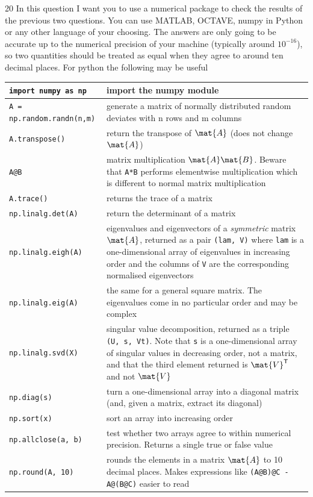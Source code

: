 \documentclass{sotonExamBoxes}    %
\begin{document}
\begin{question}{20}
    In this question I want you to use a numerical package to check
    the results of the previous two questions.  You can use MATLAB,
    OCTAVE, numpy in Python or any other language of your choosing.
    The answers are only going to be accurate up to the numerical
    precision of your machine (typically around $10^{-16}$), so two
    quantities should be treated as equal when they agree to around
    ten decimal places.  For python the following may be useful

    \begin{tabularx}{\linewidth}{@{}l|X@{}}
      \hline
      \verb+import numpy as np+ & import the numpy module\\ \hline
    \verb+A = np.random.randn(n,m)+ & generate a matrix of
      normally distributed random deviates with n rows and m columns\\ \hline
    \verb+A.transpose()+ & return the transpose of $\mat{A}$
      (does not change $\mat{A}$)\\ \hline
    \verb+A@B+ & matrix multiplication $\mat{A}\mat{B}$.  Beware
      that \verb+A*B+ performs elementwise multiplication which is
      different to normal matrix multiplication\\ \hline
    \verb+A.trace()+ & returns the trace of a matrix\\ \hline
    \verb+np.linalg.det(A)+ & return the determinant of a matrix\\ \hline
    \verb+np.linalg.eigh(A)+ & eigenvalues and eigenvectors of a
      \emph{symmetric} matrix $\mat{A}$, returned as a pair
      \verb+(lam, V)+ where \verb+lam+ is a one-dimensional array of
      eigenvalues in increasing order and the columns of \verb+V+
      are the corresponding normalised eigenvectors\\ \hline
    \verb+np.linalg.eig(A)+ & the same for a general square matrix.
      The eigenvalues come in no particular order and may be
      complex\\ \hline
    \verb+np.linalg.svd(X)+ & singular value decomposition, returned
      as a triple \verb+(U, s, Vt)+.  Note that \verb+s+ is a
      one-dimensional array of singular values in decreasing order,
      not a matrix, and that the third element returned is
      $\mat{V}^\tr$ and not $\mat{V}$\\ \hline
    \verb+np.diag(s)+ & turn a one-dimensional array into a diagonal
      matrix (and, given a matrix, extract its diagonal)\\ \hline
    \verb+np.sort(x)+ & sort an array into increasing order\\ \hline
    \verb+np.allclose(a, b)+ & test whether two arrays agree to
      within numerical precision.  Returns a single true or false
      value\\ \hline
    \verb+np.round(A, 10)+ & rounds the elements in a matrix
      $\mat{A}$ to 10 decimal places.  Makes expressions like
      \verb+(A@B)@C - A@(B@C)+ easier to read\\ \hline
    \end{tabularx}


\end{question}
\end{document}
